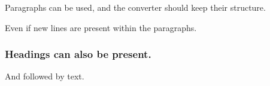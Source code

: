 Paragraphs can be used, and the converter should keep their structure.

Even if new lines
are present within the paragraphs.

\subsubsection{Headings can also be present.}

And followed by text.